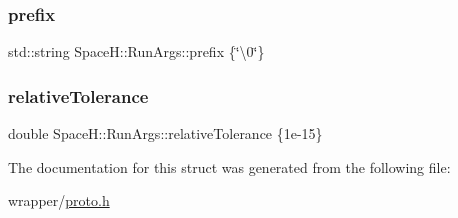 \mbox{\label{struct_space_h_1_1_run_args_aeb58d8dff1d50d813ecd2dea9d944cb2}} 
\subsubsection{\texorpdfstring{prefix}{prefix}}
{\footnotesize\ttfamily std\+::string Space\+H\+::\+Run\+Args\+::prefix \{\char`\"{}\textbackslash{}0\char`\"{}\}}

\mbox{\label{struct_space_h_1_1_run_args_a9b9ba1c4d3a78db9da6fa9539fba58cd}} 
\subsubsection{\texorpdfstring{relative\+Tolerance}{relativeTolerance}}
{\footnotesize\ttfamily double Space\+H\+::\+Run\+Args\+::relative\+Tolerance \{1e-\/15\}}



The documentation for this struct was generated from the following file\+:\begin{DoxyCompactItemize}
\item 
wrapper/\mbox{\hyperlink{proto_8h}{proto.\+h}}\end{DoxyCompactItemize}
